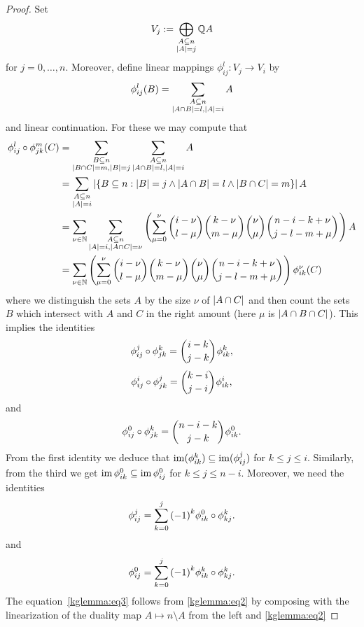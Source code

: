 \begin{proof}
  Set 
  $$
  V_j:=\bigoplus_{\substack{A\subseteq n\\ \left\vert{A}\right\vert=j}}{\mathbb{Q} A}
  $$
  for $j=0,\ldots,n$.
  Moreover, define linear mappings $\phi^l_{ij}:V_j\to V_i$ by
  $$
  \phi^l_{ij}(B) = \sum_{\substack{A\subseteq n\\ \left\vert{A\cap B}\right\vert=l, \left\vert{A}\right\vert=i}}{A}
  $$
  and linear continuation.
  For these we may compute that
  \begin{align*}
      \phi^l_{ij}\compose\phi^m_{jk}(C)
      &= \sum_{\substack{B\setleq n\\ \card{B\setmeet C}=m, \card{B}=j}}{\sum_{\substack{A\setleq n\\ \card{A\setmeet B}=l, \card{A}=i}}{A}}\\
      & = \sum_{\substack{A\setleq n\\ \card{A}=i}}{\card{\{B\setleq n: \card{B}=j\lgand\card{A\setmeet B}=l\lgand\card{B\setmeet C}=m\}}{A}}\\
      & = \sum_{\nu\in\nats}{\sum_{\substack{A\setleq n\\ \card{A}=i, \card{A\setmeet C}=\nu}}{\left(\sum_{\mu=0}^{\nu}{\binom{i-\nu}{l-\mu}\binom{k-\nu}{m-\mu}\binom{\nu}{\mu}\binom{n-i-k+\nu}{j-l-m+\mu}}\right)A}}\\
      & = \sum_{\nu\in\nats}{\left(\sum_{\mu=0}^{\nu}{\binom{i-\nu}{l-\mu}\binom{k-\nu}{m-\mu}\binom{\nu}{\mu}\binom{n-i-k+\nu}{j-l-m+\mu}}\right)\phi^{\nu}_{ik}(C)}
  \end{align*}
  where we distinguish the sets $A$ by the size $\nu$ of $\left\vert{A\cap C}\right\vert$ and then count the sets $B$ which intersect with $A$ and $C$ in the right amount (here $\mu$ is $\left\vert{A\cap B\cap C}\right\vert$).
  This implies the identities
  $$
  \phi^j_{ij}\compose\phi^k_{jk} = \binom{i-k}{j-k}\phi^k_{ik},
  $$
  $$
  \phi^i_{ij}\compose\phi^j_{jk} = \binom{k-i}{j-i}\phi^i_{ik},
  $$
  and
  $$
  \phi^0_{ij}\compose\phi^k_{jk} = \binom{n-i-k}{j-k}\phi^0_{ik}.\label{kglemma:eq1}
  $$
  From the first identity we deduce that $\mathop\mathrm{im}(\phi^k_{ik})\subseteq\mathop\mathrm{im}(\phi^j_{ij})$ for $k\leq j\leq i$. Similarly, from the third we get $\mathop\mathrm{im}\phi_{ik}^0\subseteq\mathop\mathrm{im}\phi_{ij}^0$ for $k\leq j\leq n-i$.
  Moreover, we need the identities
  $$
  \phi^j_{ij}=\sum_{k=0}^{j}{{(-1)}^k\phi^0_{ik}\circ\phi^k_{kj}}.\label{kglemma:eq2}
  $$
  and
  $$
  \phi_{ij}^0=\sum_{k=0}^j{{(-1)}^k\phi_{ik}^k\circ\phi_{kj}^k}.\label{kglemma:eq3}
  $$
  The equation~\autoref{kglemma:eq3}
  follows from \autoref{kglemma:eq2}
  by composing with the linearization of the duality map $A\mapsto n\setminus A$ from the left and \autoref{kglemma:eq2}

\end{proof}
